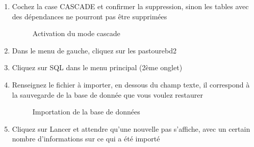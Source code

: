 \documentclass[11pt]{report}
\begin{document}
\begin{enumerate}
\item Cochez la case \og CASCADE \fg{} et confirmer la suppression, sinon les 
tables avec des dépendances ne pourront pas être supprimées

    \begin{figure}[H] 
\caption{Activation du mode cascade}
\end{figure}

\item  Dans le menu de gauche, cliquez sur les \og pastourebd2 \fg{}
\item Cliquez sur \og SQL \fg{} dans le menu principal (2ème onglet)
\item Renseignez le fichier à importer, en dessous du champ texte, il
correspond à la sauvegarde de la base de donnée que vous voulez restaurer
    \begin{figure}[H] 
\caption{Importation de la base de données}
\end{figure}
\item Cliquez sur \og Lancer \fg{} et attendre qu'une nouvelle pas s'affiche,
avec un certain nombre d'informations sur ce qui a été importé \\
\end{enumerate}
\end{document}
